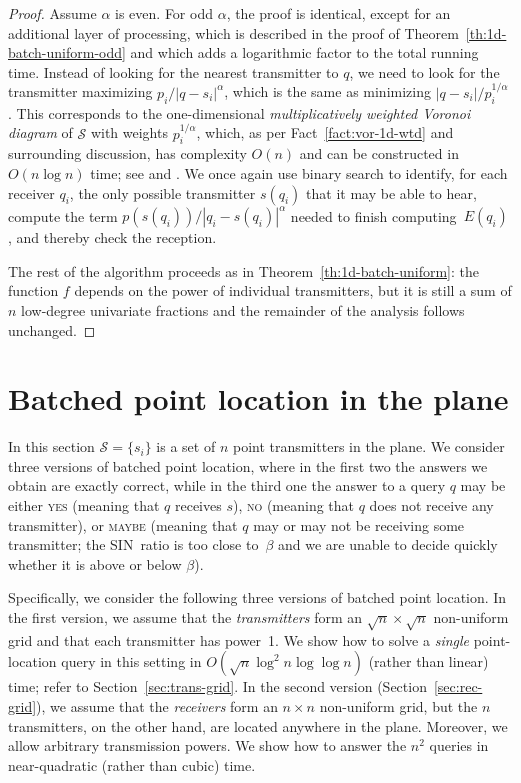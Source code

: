 \documentclass[11pt]{article}
\theoremstyle{remark}
\def\S{\mathcal{S}}
\begin{document}
\begin{proof}
  Assume $\alpha$ is even. For odd $\alpha$, the proof is identical, except for an additional layer of processing, which is described in the proof of Theorem~\ref{th:1d-batch-uniform-odd} and which adds a logarithmic factor to the total running time. 
  Instead of looking for the nearest transmitter to $q$, we need to
  look for the transmitter maximizing $p_i/|q-s_i|^\alpha$, which is
  the same as minimizing $|q-s_i|/p_i^{1/\alpha}$.  This corresponds to the
  one-dimensional \emph{multiplicatively weighted Voronoi diagram} of
  $\S$ with weights $p_i^{1/\alpha}$, which, as per Fact~\ref{fact:vor-1d-wtd} and surrounding discussion, has complexity $O(n)$ and can be constructed 
  in~$O(n \log n)$ time; see \cite{a-odwvd-86} and
  \cite[Theorem~6.1]{sa-dsstg-95}.  We once again use binary search to
  identify, for each receiver $q_i$, the only possible transmitter
  $s(q_i)$ that it may be able to hear, compute the term
  $p(s(q_i))/|q_i-s(q_i)|^\alpha$ needed to finish computing~$E(q_i)$, and thereby
  check the reception.

  The rest of the algorithm proceeds as in
  Theorem~\ref{th:1d-batch-uniform}: the function $f$ depends on the
  power of individual transmitters, but it is still a sum of $n$
  low-degree univariate fractions and the remainder of the analysis follows unchanged.
\end{proof}




\section{Batched point location in the plane}
\label{sec:2d}

In this section $\S=\{s_i\}$ is a set of $n$ point transmitters in the plane.
We consider three versions of batched point location, where in the
first two the answers we obtain are exactly correct, while in the
third one the answer to a query $q$ may be either \textsc{yes} (meaning
that $q$ receives $s$), \textsc{no} (meaning that $q$ does not receive any
transmitter), or \textsc{maybe} (meaning that $q$ may or may not be receiving some 
transmitter; the SIN~ratio is too close to~$\beta$ and we are unable to decide quickly whether it is above or below $\beta$).   

Specifically, we consider the following three versions of batched point location.
In the first version, we assume that the \emph{transmitters} form an $\sqrt{n} \times \sqrt{n}$ non-uniform grid and
that each transmitter has power~1. We show how to solve a \emph{single} point-location query in this setting
in $O(\sqrt{n} \log^2 n \log \log n)$ (rather than linear) time; refer to Section~\ref{sec:trans-grid}.
In the second version (Section~\ref{sec:rec-grid}),  
we assume that the \emph{receivers} form an $n \times n$ non-uniform grid, but
the $n$ transmitters, on the other hand, are located anywhere in the plane.
Moreover, we allow arbitrary transmission powers.
We show how to answer the $n^2$ queries in near-quadratic (rather than cubic) time.
\end{document}
